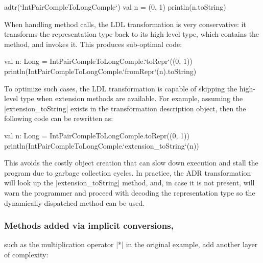 \begin{lstlisting-nobreak}
adtr(`IntPairCompleToLongComple`) {
  val n = (0, 1)
  println(n.toString)
}
\end{lstlisting-nobreak}


When handling method calls, the LDL transformation is very conservative: it transforms the representation type back to its high-level type, which contains the method, and invokes it. This produces sub-optimal code:

\begin{lstlisting-nobreak}
val n: Long = IntPairCompleToLongComple.`toRepr`((0, 1))
println(IntPairCompleToLongComple.`fromRepr`(n).toString)
\end{lstlisting-nobreak}

To optimize such cases, the LDL transformation is capable of skipping the high-level type when extension methods are available. For example, assuming the |extension_toString| exists in the transformation description object, then the following code can be rewritten as:

\begin{lstlisting-nobreak}
val n: Long = IntPairCompleToLongComple.toRepr((0, 1))
println(IntPairCompleToLongComple.`extension_toString`(n))
\end{lstlisting-nobreak}

This avoids the costly object creation that can slow down execution and stall the program due to garbage collection cycles. In practice, the ADR transformation will look up the |extension_toString| method, and, in case it is not present, will warn the programmer and proceed with decoding the representation type so the dynamically dispatched method can be used.

\subsubsection{Methods added via implicit conversions,} such as the multiplication operator |*| in the original example, add another layer of complexity:

